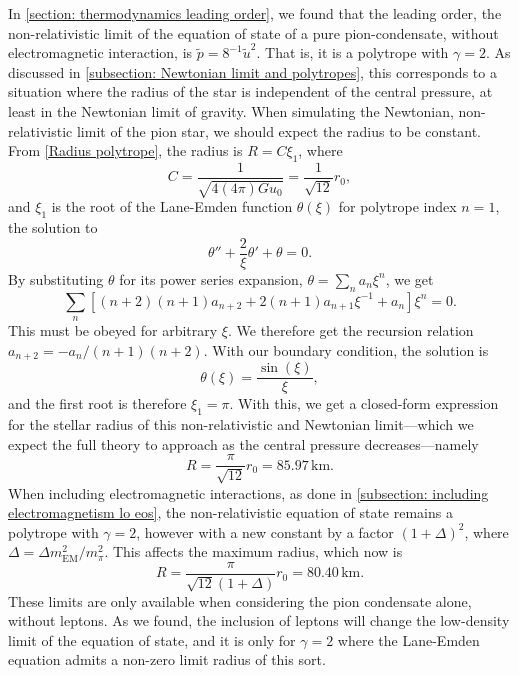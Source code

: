 In \autoref{section: thermodynamics leading order}, we found that the leading order, the non-relativistic limit of the equation of state of a pure pion-condensate, without electromagnetic interaction, is $\tilde p =8^{-1} \tilde u^2$.
That is, it is a polytrope with $\gamma = 2$.
As discussed in \autoref{subsection: Newtonian limit and polytropes}, this corresponds to a situation where the radius of the star is independent of the central pressure, at least in the Newtonian limit of gravity.
When simulating the Newtonian, non-relativistic limit of the pion star, we should expect the radius to be constant.
From \autoref{Radius polytrope}, the radius is $R = C \xi_1$, where
%
\begin{equation}
    C = \frac{1}{\sqrt{4(4\pi ) G u_0}} = \frac{1}{\sqrt{12}}r_0,
\end{equation}
%
and $\xi_1$ is the root of the Lane-Emden function $\theta(\xi)$ for polytrope index $n=1$, the solution to
%
\begin{equation}
    \theta'' + \frac{2}{\xi} \theta' + \theta = 0.
\end{equation}
%
By substituting $\theta$ for its power series expansion, $\theta = \sum_n a_n \xi^n$, we get
%
\begin{equation}
    \sum_n \left[ (n+2)(n+1) a_{n+2} + 2(n+1) a_{n+1} \xi^{-1} + a_n \right] \xi^n = 0.
\end{equation}
%
This must be obeyed for arbitrary $\xi$.
We therefore get the recursion relation $a_{n+2} = - a_n / (n+1)(n+2)$.
With our boundary condition, the solution is
%
\begin{equation}
    \theta(\xi) = \frac{\sin(\xi)}{\xi},
\end{equation}
%
and the first root is therefore $\xi_1 = \pi$.
With this, we get a closed-form expression for the stellar radius of this non-relativistic and Newtonian limit---which we expect the full theory to approach as the central pressure decreases---namely
%
\begin{equation}
    \label{radius pion star nr limit}
    R = \frac{\pi}{\sqrt{12}} r_0 = 85.97 \, \text{km}.
\end{equation}
%
When including electromagnetic interactions, as done in \autoref{subsection: including electromagnetism lo eos}, the non-relativistic equation of state remains a polytrope with $\gamma=2$, however with a new constant by a factor $(1+\Delta)^2$, where $\Delta = \Delta m^2_\text{EM}/m_\pi^2$.
This affects the maximum radius, which now is
%
\begin{equation}
    \label{maximum mass pion star with em interaction}
    R = \frac{\pi}{\sqrt{12}(1 + \Delta)} r_0 = 80.40 \, \text{km}.
\end{equation}
%
These limits are only available when considering the pion condensate alone, without leptons.
As we found, the inclusion of leptons will change the low-density limit of the equation of state, and it is only for $\gamma=2$ where the Lane-Emden equation admits a non-zero limit radius of this sort.


